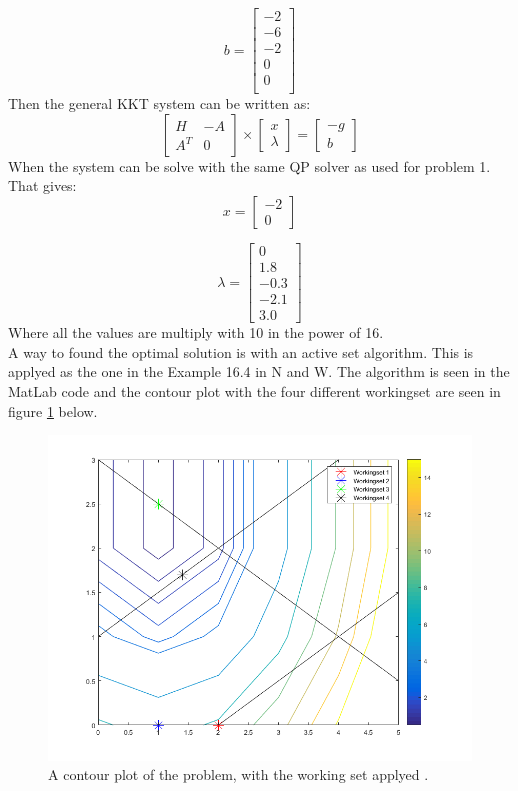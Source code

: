 \[b= \begin{bmatrix}
	-2 \\-6 \\-2 \\0 \\0 \\
\end{bmatrix}\]
Then the general KKT system can be written as:
\[\begin{bmatrix}
	H & -A \\A^T & 0
\end{bmatrix}\times
	\begin{bmatrix}
		x\\ \lambda
	\end{bmatrix}=
		\begin{bmatrix}
			-g\\ b
	\end{bmatrix}\]
When the system can be solve with the same QP solver as used for problem 1. That gives:
\[x=\begin{bmatrix}
	-2 \\ 0
\end{bmatrix}\]

\[\lambda=\begin{bmatrix}
	0 \\1.8 \\-0.3 \\-2.1 \\ 3.0
\end{bmatrix}\]
Where all the values are multiply with 10 in the power of 16. 
\\A way to found the optimal solution is with an active set algorithm. This is applyed as the one in the Example 16.4 in N and W. The algorithm is seen in the MatLab code and the contour plot with the four different workingset are seen in figure \ref{fig:exe3_contour_plot_workingset} below. 
\begin{figure}[H]
	\centering
		\includegraphics[scale=0.65]{exe3_contour_plot_workingset.png} 
	\caption{A contour plot of the problem, with the working set applyed .}
	\label{fig:exe3_contour_plot_workingset}
\end{figure} 
